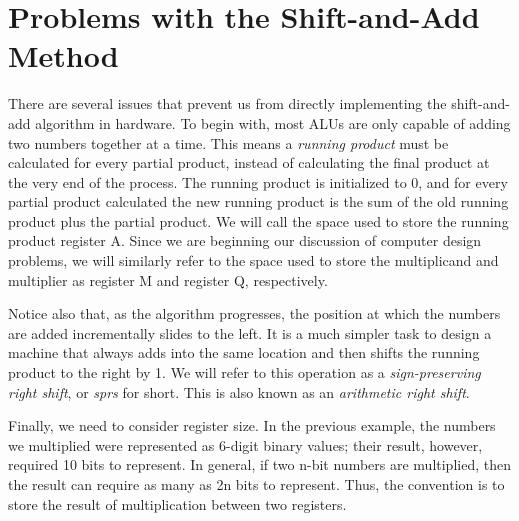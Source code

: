 \documentclass{article}
\begin{document}
\section{Problems with the Shift-and-Add Method}
There are several issues that prevent us from directly implementing the shift-and-add algorithm in hardware.
To begin with, most ALUs are only capable of adding two numbers together at a time.
This means a \emph{running product} must be calculated for every partial product, instead of calculating the final product at the very end of the process.
The running product is initialized to 0, and for every partial product calculated the new running product is the sum of the old running product plus the partial product.
We will call the space used to store the running product register A.
Since we are beginning our discussion of computer design problems, we will similarly refer to the space used to store the multiplicand and multiplier as register M and register Q, respectively.

Notice also that, as the algorithm progresses, the position at which the numbers are added incrementally slides to the left.
It is a much simpler task to design a machine that always adds into the same location and then shifts the running product to the right by 1.
We will refer to this operation as a \emph{sign-preserving right shift}, or \emph{sprs} for short.%
This is also known as an \emph{arithmetic right shift}.

Finally, we need to consider register size.
In the previous example, the numbers we multiplied were represented as 6-digit binary values; their result, however, required 10 bits to represent.
In general, if two n-bit numbers are multiplied, then the result can require as many as 2n bits to represent.
Thus, the convention is to store the result of multiplication between two registers.
\end{document}
